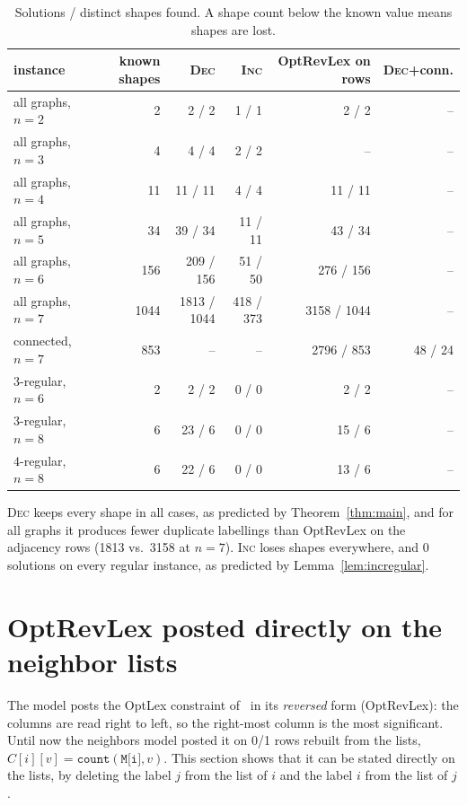 \documentclass[11pt,a4paper]{article}
\theoremstyle{definition}
\theoremstyle{remark}
\begin{document}
\begin{table}[ht]
\centering
\caption{Solutions / distinct shapes found. A shape count below the known value means shapes
are lost.}
\label{tab:exp}
\begin{tabular}{l r rrr r}
\toprule
instance & known shapes & \textsc{Dec} & \textsc{Inc} & OptRevLex on rows & \textsc{Dec}+conn.\\
\midrule
all graphs, $n=2$ & 2    & 2 / 2        & 1 / 1       & 2 / 2       & -- \\
all graphs, $n=3$ & 4    & 4 / 4        & 2 / 2       & --          & -- \\
all graphs, $n=4$ & 11   & 11 / 11      & 4 / 4       & 11 / 11     & -- \\
all graphs, $n=5$ & 34   & 39 / 34      & 11 / 11     & 43 / 34     & -- \\
all graphs, $n=6$ & 156  & 209 / 156    & 51 / 50     & 276 / 156   & -- \\
all graphs, $n=7$ & 1044 & 1813 / 1044  & 418 / 373   & 3158 / 1044 & -- \\
connected, $n=7$  & 853  & --           & --          & 2796 / 853  & 48 / 24 \\
$3$-regular, $n=6$ & 2   & 2 / 2        & 0 / 0       & 2 / 2       & -- \\
$3$-regular, $n=8$ & 6   & 23 / 6       & 0 / 0       & 15 / 6      & -- \\
$4$-regular, $n=8$ & 6   & 22 / 6       & 0 / 0       & 13 / 6      & -- \\
\bottomrule
\end{tabular}
\end{table}

\textsc{Dec} keeps every shape in all cases, as predicted by Theorem~\ref{thm:main}, and
for all graphs it produces fewer duplicate labellings than OptRevLex on the adjacency rows
(1813 vs.\ 3158 at $n=7$). \textsc{Inc} loses shapes everywhere, and $0$ solutions on every
regular instance, as predicted by Lemma~\ref{lem:incregular}.

\section{OptRevLex posted directly on the neighbor lists}\label{sec:direct}

The model posts the OptLex constraint of~\cite{codish13} in its \emph{reversed} form
(OptRevLex): the columns are read right to left, so the right-most column is the most
significant. Until now the neighbors model posted it on 0/1 rows rebuilt from the lists,
$C[i][v]=\texttt{count}(\texttt{M[i]},v)$. This section shows that it can be stated
directly on the lists, by deleting the label $j$ from the list of $i$ and the label $i$ from
the list of $j$.
\end{document}

